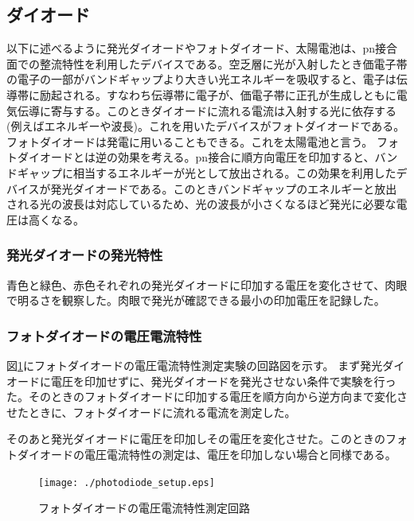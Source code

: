 \documentclass[11pt,a4]{jarticle}
\begin{document}
\subsection{ダイオード}

以下に述べるように発光ダイオードやフォトダイオード、太陽電池は、pn接合面での整流特性を利用したデバイスである。空乏層に光が入射したとき価電子帯の電子の一部がバンドギャップより大きい光エネルギーを吸収すると、電子は伝導帯に励起される。すなわち伝導帯に電子が、価電子帯に正孔が生成しともに電気伝導に寄与する。このときダイオードに流れる電流は入射する光に依存する(例えばエネルギーや波長)。これを用いたデバイスがフォトダイオードである。フォトダイオードは発電に用いることもできる。これを太陽電池と言う。
フォトダイオードとは逆の効果を考える。pn接合に順方向電圧を印加すると、バンドギャップに相当するエネルギーが光として放出される。この効果を利用したデバイスが発光ダイオードである。このときバンドギャップのエネルギーと放出される光の波長は対応しているため、光の波長が小さくなるほど発光に必要な電圧は高くなる。

\subsubsection{発光ダイオードの発光特性}
青色と緑色、赤色それぞれの発光ダイオードに印加する電圧を変化させて、肉眼で明るさを観察した。肉眼で発光が確認できる最小の印加電圧を記録した。

\subsubsection{フォトダイオードの電圧電流特性}
図\ref{fig:photodiode_setup}にフォトダイオードの電圧電流特性測定実験の回路図を示す。
まず発光ダイオードに電圧を印加せずに、発光ダイオードを発光させない条件で実験を行った。そのときのフォトダイオードに印加する電圧を順方向から逆方向まで変化させたときに、フォトダイオードに流れる電流を測定した。

そのあと発光ダイオードに電圧を印加しその電圧を変化させた。このときのフォトダイオードの電圧電流特性の測定は、電圧を印加しない場合と同様である。
\begin{figure}[!htbp]
   \begin{center}
    \texttt{[image: ./photodiode\_setup.eps]}
    \caption{フォトダイオードの電圧電流特性測定回路}
     \label{fig:photodiode_setup}
   \end{center}
\end{figure}
\end{document}

